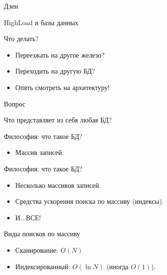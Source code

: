 \documentclass[aspectratio=169]{beamer}
\begin{document}
\begin{frame}
    \begin{center}
        {\huge Дзен}
    \end{center}
\end{frame}


\begin{frame}{HighLoad и базы данных}
    \begin{block}{Что делать?}
        \begin{itemize}
            \item Переезжать на другое железо?
            \item Переходить на другую БД?
        \end{itemize}
        \par
        \begin{itemize}
            \pause\item Опять смотреть на архитектуру!
        \end{itemize}
    \end{block}
\end{frame}



\begin{frame}{Вопрос}
    \begin{center}
        {\huge Что представляет из себя любая БД?}
    \end{center}
\end{frame}

\begin{frame}{Философия: что такое БД?}
    \begin{itemize}
        \pause\item Массив записей.
    \end{itemize}
\end{frame}

\begin{frame}{Философия: что такое БД?}
    \begin{itemize}
        \item Несколько массивов записей.
        \pause\item Средства ускорения поиска по массиву (индексы).
        \pause\item И...\pause ВСЕ!
    \end{itemize}
\end{frame}

\begin{frame}{Виды поисков по массиву}
    \begin{itemize}
        \item Сканирование: $O(N)$
        \item Индексированный: $O(\ln N)$ (иногда $O(1)$).
    \end{itemize}
\end{frame}
\end{document}
